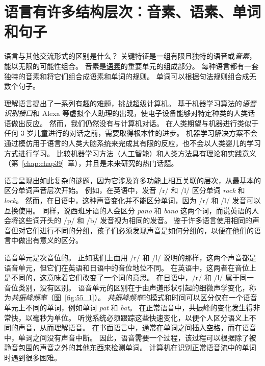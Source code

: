 \section{语言有许多结构层次：音素、语素、单词和句子}

语言与其他交流形式的区别是什么？
关键特征是一组有限且独特的语音或\textit{音素}，能以无限的可能性组合。
音素是\href{https://baike.baidu.com/item/%E8%AF%AD%E7%B4%A0}{语素}的重要单元的组成部分。
每种语言都有一套独特的音素和将它们组合成语素和单词的规则。
单词可以根据句法规则组合成无数个句子。


理解语言提出了一系列有趣的难题，挑战超级计算机。
基于机器学习算法的\textit{语音识别接口}和 Alexa 等虚拟个人助理的出现，使电子设备能够对特定种类的人类话语做出反应。
然而，我们仍然没有与计算机对话。
在人类期望与机器进行类似于任何 3 岁儿童进行的对话之前，需要取得根本性的进步。
机器学习解决方案不会通过模仿用于语言的人类大脑系统来完成其有限的反应，也不会以人类婴儿的学习方式进行学习。
比较机器学习方法（人工智能）和人类方法具有理论和实践意义（第~\ref{chap:chap39}~章），并且是未来研究的热门话题。


语言呈现出如此复杂的谜题，因为它涉及许多功能上相互关联的层次，从最基本的区分单词声音层次开始。
例如，在英语中，发音 /r/ 和 /l/ 区分单词 \textit{rock} 和 \textit{lock}。
然而，在日语中，这种声音变化并不能区分单词，因为 /r/ 和 /l/ 发音可以互换使用。
同样，说西班牙语的人会区分 \textit{pano} 和 \textit{bano} 这两个词，而说英语的人会将这些词开头的 /p/ 和 /b/ 发音视为相同的发音。
鉴于许多语言使用相同的声音但对它们进行不同的分组，孩子们必须发现声音是如何分组的，以便在他们的语言中做出有意义的区分。


语音单元是次音位的。
正如我们上面用 /r/ 和 /l/ 说明的那样，这两个声音都是语音单元，但它们在英语和日语中的音位地位不同。
在英语中，这两者在音位上是不同的，这意味着它们改变了一个词的意思。
在日语中，/r/ 和 /l/ 属于同一音位类别，没有区别。
语音单元的区别在于由声道形状引起的细微声学变化，称为\textit{共振峰频率}（图~\ref{fig:55_1}）。
\textit{共振峰频率}的模式和时间可以区分仅在一个语音单元上不同的单词，例如单词 \textit{pat} 和 \textit{bat}。
在正常语音中，共振峰的变化发生得非常快，以毫秒为单位。
听觉系统必须跟踪这些快速变化，以便个人区分语义上不同的声音，从而理解语音。
在书面语言中，通常在单词之间插入空格，而在语音中，单词之间没有声音中断。
因此，语音需要一个过程，该过程可以根据除了被静音包围的声音之外的其他东西来检测单词。
计算机在识别正常语音流中的单词时遇到很多困难。


